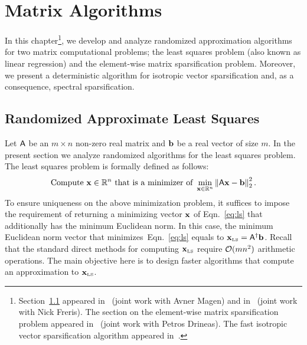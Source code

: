\chapter{Matrix Algorithms}\label{chap:ma}
In this chapter\footnote{Section~\ref{sec:LS} appeared in~\cite{chernoff:matrix_valued:MZ11} (joint work with Avner Magen) and in~\cite{REK} (joint work with Nick Freris). The section on the element-wise matrix sparsification problem appeared in~\cite{matrix:sparsification:IPL2011} (joint work with Petros Drineas). The fast isotropic vector sparsification algorithm appeared in~\cite{ICALP12}.}, we develop and analyze randomized approximation algorithms for two matrix computational problems; the least squares problem (also known as linear regression) and the element-wise matrix sparsification problem. Moreover, we present a deterministic algorithm for isotropic vector sparsification and, as a consequence, spectral sparsification.
%
%
\section{Randomized Approximate Least Squares}\label{sec:LS}
%
Let ${\mathsf{A} }$ be an $m\times n$ non-zero real matrix and ${\mathbf b}$ be a real vector of size $m$. In the present section we analyze randomized algorithms for the least squares problem. The least squares problem is formally defined as follows:
\begin{equation}\label{eq:ls}
\text{Compute }\mathbf{x}\in \mathbb{R}^n \text{ that is a minimizer of } \min_{\mathbf{x}\in\mathbb{R}^n} \left\|{\mathsf{A} } \mathbf{x} - {\mathbf b}\right\|_2^2.
\end{equation}
To ensure uniqueness on the above minimization problem, it suffices to impose the requirement of returning a minimizing vector $\mathbf{x}$ of Eqn.~\eqref{eq:ls} that additionally has the minimum Euclidean norm. In this case, the minimum Euclidean norm vector that minimizes~Eqn.~\eqref{eq:ls} equals to $\mathbf{x}_{\textrm{\tiny LS}}={{\mathsf{A} }}^\dagger{\mathbf b}$. Recall that the standard direct methods for computing $\mathbf{x}_{\textrm{\tiny LS}}$ require $\mathcal{O}(mn^2)$ arithmetic operations. The main objective here is to design faster algorithms that compute an approximation to $\mathbf{x}_{\textrm{\tiny LS}}$.
%

